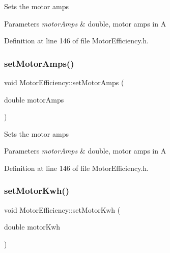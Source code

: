 Sets the motor amps 
\begin{DoxyParams}{Parameters}
{\em motor\+Amps} & double, motor amps in A \\
\hline
\end{DoxyParams}


Definition at line 146 of file Motor\+Efficiency.\+h.

\mbox{\label{class_motor_efficiency_ac86aa8d6162e63eb440e07e557534c74}} 
\subsubsection{\texorpdfstring{set\+Motor\+Amps()}{setMotorAmps()}\hspace{0.1cm}{\footnotesize\ttfamily [3/3]}}
{\footnotesize\ttfamily void Motor\+Efficiency\+::set\+Motor\+Amps (\begin{DoxyParamCaption}\item[{double}]{motor\+Amps }\end{DoxyParamCaption})\hspace{0.3cm}{\ttfamily [inline]}}

Sets the motor amps 
\begin{DoxyParams}{Parameters}
{\em motor\+Amps} & double, motor amps in A \\
\hline
\end{DoxyParams}


Definition at line 146 of file Motor\+Efficiency.\+h.

\mbox{\label{class_motor_efficiency_ab1c7507bac259565e43a6777d079148b}} 
\subsubsection{\texorpdfstring{set\+Motor\+Kwh()}{setMotorKwh()}\hspace{0.1cm}{\footnotesize\ttfamily [1/3]}}
{\footnotesize\ttfamily void Motor\+Efficiency\+::set\+Motor\+Kwh (\begin{DoxyParamCaption}\item[{double}]{motor\+Kwh }\end{DoxyParamCaption})\hspace{0.3cm}{\ttfamily [inline]}}

